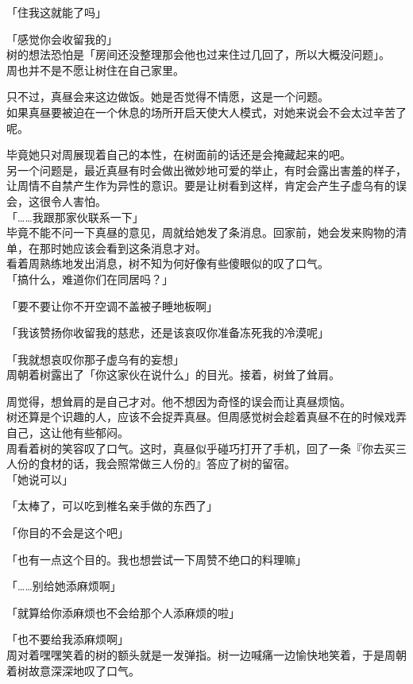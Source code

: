「住我这就能了吗」

「感觉你会收留我的」\\

树的想法恐怕是「房间还没整理那会他也过来住过几回了，所以大概没问题」。\\

周也并不是不愿让树住在自己家里。

只不过，真昼会来这边做饭。她是否觉得不情愿，这是一个问题。\\

如果真昼要被迫在一个休息的场所开启天使大人模式，对她来说会不会太过辛苦了呢。

毕竟她只对周展现着自己的本性，在树面前的话还是会掩藏起来的吧。\\

另一个问题是，最近真昼有时会做出微妙地可爱的举止，有时会露出害羞的样子，让周情不自禁产生作为异性的意识。要是让树看到这样，肯定会产生子虚乌有的误会，这很令人害怕。\\

「……我跟那家伙联系一下」\\

毕竟不能不问一下真昼的意见，周就给她发了条消息。回家前，她会发来购物的清单，在那时她应该会看到这条消息才对。\\

看着周熟练地发出消息，树不知为何好像有些傻眼似的叹了口气。\\

「搞什么，难道你们在同居吗？」

「要不要让你不开空调不盖被子睡地板啊」

「我该赞扬你收留我的慈悲，还是该哀叹你准备冻死我的冷漠呢」

「我就想哀叹你那子虚乌有的妄想」\\

周朝着树露出了「你这家伙在说什么」的目光。接着，树耸了耸肩。

周觉得，想耸肩的是自己才对。他不想因为奇怪的误会而让真昼烦恼。\\

树还算是个识趣的人，应该不会捉弄真昼。但周感觉树会趁着真昼不在的时候戏弄自己，这让他有些郁闷。\\

周看着树的笑容叹了口气。这时，真昼似乎碰巧打开了手机，回了一条『你去买三人份的食材的话，我会照常做三人份的』答应了树的留宿。\\

「她说可以」

「太棒了，可以吃到椎名亲手做的东西了」

「你目的不会是这个吧」

「也有一点这个目的。我也想尝试一下周赞不绝口的料理嘛」

「……别给她添麻烦啊」

「就算给你添麻烦也不会给那个人添麻烦的啦」

「也不要给我添麻烦啊」\\

周对着嘿嘿笑着的树的额头就是一发弹指。树一边喊痛一边愉快地笑着，于是周朝着树故意深深地叹了口气。
